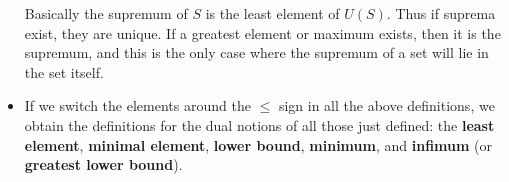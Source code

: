 \documentclass[../real_analysis.tex]{subfiles}
\begin{document}
\begin{definition}
\begin{itemize}
                    Basically the supremum of $S$ is the least element of $U(S)$. Thus if suprema exist, they are unique. If a greatest element or maximum exists, then it is the supremum, and this is the only case where the supremum of a set will lie in the set itself.
                    \item If we switch the elements around the $\leq$ sign in all the above definitions, we obtain the definitions for the dual notions of all those just defined: the \textbf{least element}, \textbf{minimal element}, \textbf{lower bound}, \textbf{minimum}, and \textbf{infimum} (or \textbf{greatest lower bound}).
                \end{itemize}
            \end{definition}


\end{document}
